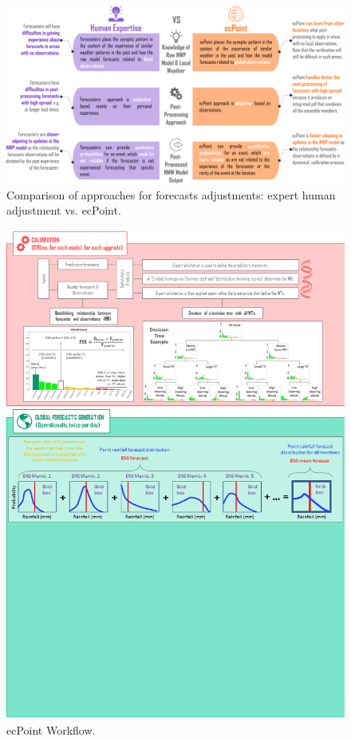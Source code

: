 \documentclass[twocol]{ametsocV5} %
\begin{document}
\begin{figure}
\centerline{\includegraphics[width=39pc]{manuscript/Figures/Fig2.png}}
\caption{Comparison of approaches for forecasts adjustments: expert human adjustment vs. ecPoint.}
\label{Fig.2}
\end{figure}

\begin{figure}
\centerline{\includegraphics[width=39pc]{manuscript/Figures/Fig22.png}}
\caption{ecPoint Workflow.}
\label{Fig.22}
\end{figure}
\end{document}
